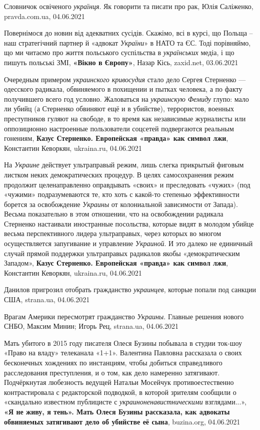 Словничок освіченого \emph{українця}. Як говорити та писати про рак,
Юлія Саліженко, pravda.com.ua, 04.06.2021

Повернімося до новин від адекватних сусідів. Скажімо, всі в курсі, що Польща –
наш стратегічний партнер й «адвокат \emph{України}» в НАТО та ЄС. Тоді
порівняймо, що ми читаємо про життя польського суспільства в \emph{українських}
медіа, і що пишуть польські ЗМІ,
\textbf{«Вікно в Європу»}, Назар Кісь, zaxid.net, 03.06.2021

Очередным примером \emph{украинского кривосудия} стало дело Сергея Стерненко —
одесского радикала, обвиняемого в похищении и пытках человека, а по факту
получившего всего год условно. Жаловаться на \emph{украинскую Фемиду} глупо:
мало ли убийц (а Стерненко обвиняют ещё и в убийстве), террористов, военных
преступников гуляют на свободе, в то время как независимые журналисты или
оппозиционно настроенные пользователи соцсетей подвергаются реальным гонениям,
\textbf{Казус Стерненко. Европейская «правда» как символ лжи}, 
Константин Кеворкян, ukraina.ru, 04.06.2021

На \emph{Украине} действует ультраправый режим, лишь слегка прикрытый фиговым листком
неких демократических процедур. В целях самосохранения режим продолжит
целенаправленно оправдывать «своих» и преследовать «чужих» (под «чужими»
подразумеваются те, кто хоть с какой-то степенью эффективности борется за
освобождение \emph{Украины} от колониальной зависимости от Запада).  Весьма
показательно в этом отношении, что на освобождении радикала Стерненко
настаивали иностранные посольства, которые видят в молодом убийце весьма
перспективного лидера ультраправых, через которых во многом осуществляется
запугивание и управление \emph{Украиной}. И это далеко не единичный случай прямой
поддержки ультраправых радикалов якобы «демократическим Западом»,
\textbf{Казус Стерненко. Европейская «правда» как символ лжи}, 
Константин Кеворкян, ukraina.ru, 04.06.2021

Данилов пригрозил отобрать гражданство \emph{украинцев}, которые попали под
санкции США, strana.ua, 04.06.2021

Врагам Америки пересмотрят гражданство \emph{Украины}. Главные решения нового СНБО,
Максим Минин; Игорь Рец, strana.ua, 04.06.2021

Мать убитого в 2015 году писателя Олеся Бузины побывала в студии ток-шоу «Право
на владу» телеканала «1+1». Валентина Павловна рассказала о своих бесконечных
хождениях по инстанциям, чтобы добиться справедливого расследования
преступления, и о том, как дело намеренно затягивают. Подчёркнутая любезность
ведущей Натальи Мосейчук противоестественно контрастировала с редакторской
подводкой, в которой зрителям сообщили о «скандально известном публицисте с
\emph{украиноненавистническими} взглядами...»,
\textbf{«Я не живу, я тень». Мать Олеся Бузины рассказала, как адвокаты обвиняемых затягивают дело об убийстве её сына},
buzina.org, 04.06.2021

